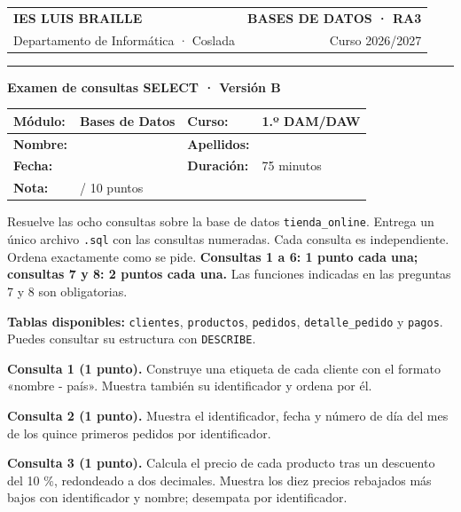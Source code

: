\documentclass[12pt,a4paper]{article}
\begin{document}
\begin{tabularx}{\textwidth}{@{}Xr@{}}
{\color{primary}\Large\bfseries IES LUIS BRAILLE} & {\color{secondary}\bfseries BASES DE DATOS · RA3} \\
Departamento de Informática · Coslada & Curso 2026/2027 \\
\end{tabularx}
{\color{primary}\rule{\textwidth}{1.2pt}}
\begin{center}{\Large\bfseries Examen de consultas SELECT · Versión B}\end{center}
\vspace{0.2cm}
\begin{tabularx}{\textwidth}{|p{2.4cm}|X|p{2.2cm}|X|}
\hline
\textbf{Módulo:} & Bases de Datos & \textbf{Curso:} & 1.º DAM/DAW \\ \hline
\textbf{Nombre:} & & \textbf{Apellidos:} & \\ \hline
\textbf{Fecha:} & & \textbf{Duración:} & 75 minutos \\ \hline
\textbf{Nota:} & \multicolumn{3}{l|}{\hspace{2cm}/ 10 puntos} \\ \hline
\end{tabularx}
\vspace{0.35cm}
\begin{tcolorbox}[title=Instrucciones]
Resuelve las ocho consultas sobre la base de datos \texttt{tienda\_online}. Entrega un único archivo \texttt{.sql} con las consultas numeradas. Cada consulta es independiente. Ordena exactamente como se pide. \textbf{Consultas 1 a 6: 1 punto cada una; consultas 7 y 8: 2 puntos cada una.} Las funciones indicadas en las preguntas 7 y 8 son obligatorias.
\end{tcolorbox}
{\small\textbf{Tablas disponibles:} \texttt{clientes}, \texttt{productos}, \texttt{pedidos}, \texttt{detalle\_pedido} y \texttt{pagos}. Puedes consultar su estructura con \texttt{DESCRIBE}.}
\par\vspace{0.25cm}
\textbf{Consulta 1 (1 punto).} Construye una etiqueta de cada cliente con el formato «nombre - país». Muestra también su identificador y ordena por él.\par\vspace{0.65em}
\textbf{Consulta 2 (1 punto).} Muestra el identificador, fecha y número de día del mes de los quince primeros pedidos por identificador.\par\vspace{0.65em}
\textbf{Consulta 3 (1 punto).} Calcula el precio de cada producto tras un descuento del 10 \%, redondeado a dos decimales. Muestra los diez precios rebajados más bajos con identificador y nombre; desempata por identificador.\par\vspace{0.65em}
\end{document}

